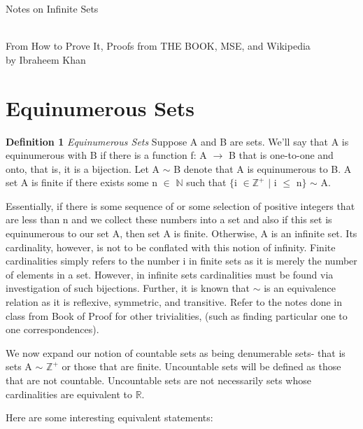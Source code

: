 \documentclass{article}
\begin{document}
\setlength\parindent{24pt}
\begin{center}
\begin{huge}
Notes on Infinite Sets
\end{huge}
\\
From How to Prove It, Proofs from THE BOOK, MSE, and Wikipedia
\\
by Ibraheem Khan
\end{center}

\section{Equinumerous Sets}

\textbf{Definition 1} \textit{Equinumerous Sets} Suppose A and B are sets. We'll say that A is equinumerous with B if there is a function f: A $\to$ B that is one-to-one and onto, that is, it is a bijection. Let A $\sim$ B denote that A is equinumerous to B. A set A is finite if there exists some n $\in$ $\mathbb{N}$ such that $\{$i $\in \mathbb{Z}^{+}$ $|$ i $\leq$ n$\}$ $\sim$ A.
\\
\par Essentially, if there is some sequence of or some selection of positive integers that are less than n and we collect these numbers into a set and also if this set is equinumerous to our set A, then set A is finite. Otherwise, A is an infinite set. Its cardinality, however, is not to be conflated with this notion of infinity. Finite cardinalities simply refers to the number i in finite sets as it is merely the number of elements in a set. However, in infinite sets cardinalities must be found via investigation of such bijections. Further, it is known that $\sim$ is an equivalence relation as it is reflexive, symmetric, and transitive. Refer to the notes done in class from Book of Proof for other trivialities, (such as finding particular one to one correspondences). 
\\
\par We now expand our notion of countable sets as being denumerable sets- that is sets A $\sim$ $\mathbb{Z}^{+}$ or those that are finite. Uncountable sets will be defined as those that are not countable. Uncountable sets are not necessarily sets whose cardinalities are equivalent to $\mathbb{R}$. 
\\
\par Here are some interesting equivalent statements:
\end{document}
